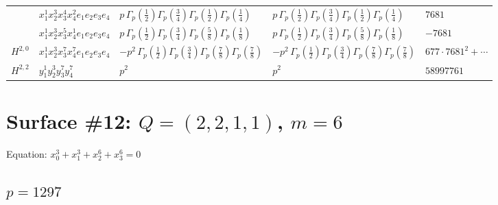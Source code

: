 \documentclass[11pt]{article}
\begin{document}
\begin{table}[ht]
{\begin{tabular}{@{}lllll@{}}
 & $x_{1}^{1} x_{2}^{3} x_{3}^{4} x_{4}^{2}  e_{1} e_{2} e_{3} e_{4}$ & $p \, \Gamma_p \left( \frac{1}{2} \right) \Gamma_p \left( \frac{3}{4} \right) \Gamma_p \left( \frac{1}{2} \right) \Gamma_p \left( \frac{1}{4} \right)$ & $p \, \Gamma_p \left( \frac{1}{2} \right) \Gamma_p \left( \frac{3}{4} \right) \Gamma_p \left( \frac{1}{2} \right) \Gamma_p \left( \frac{1}{4} \right)$ & $7681$ \\
 & $x_{1}^{1} x_{2}^{3} x_{3}^{5} x_{4}^{1}  e_{1} e_{2} e_{3} e_{4}$ & $p \, \Gamma_p \left( \frac{1}{2} \right) \Gamma_p \left( \frac{3}{4} \right) \Gamma_p \left( \frac{5}{8} \right) \Gamma_p \left( \frac{1}{8} \right)$ & $p \, \Gamma_p \left( \frac{1}{2} \right) \Gamma_p \left( \frac{3}{4} \right) \Gamma_p \left( \frac{5}{8} \right) \Gamma_p \left( \frac{1}{8} \right)$ & $-7681$ \\
\midrule
$H^{2,0}$ & $x_{1}^{1} x_{2}^{3} x_{3}^{7} x_{4}^{7}  e_{1} e_{2} e_{3} e_{4}$ & $- p^{2} \, \Gamma_p \left( \frac{1}{2} \right) \Gamma_p \left( \frac{3}{4} \right) \Gamma_p \left( \frac{7}{8} \right) \Gamma_p \left( \frac{7}{8} \right)$ & $- p^{2} \, \Gamma_p \left( \frac{1}{2} \right) \Gamma_p \left( \frac{3}{4} \right) \Gamma_p \left( \frac{7}{8} \right) \Gamma_p \left( \frac{7}{8} \right)$ & $677{\cdot}7681^{2}{+}\cdots$ \\
\midrule
$H^{2,2}$ & $y_{1}^{1} y_{2}^{3} y_{3}^{7} y_{4}^{7}$ & $p^{2} \,$ & $p^{2} \,$ & $58997761$ \\
\bottomrule
\end{tabular}
}
\renewcommand{\arraystretch}{1.0}
\end{table}

\newpage

\section*{Surface \#12: $Q=(2, 2, 1, 1)$, $m=6$}

Equation: $x_0^{3} + x_1^{3} + x_2^{6} + x_3^{6} = 0$

\subsection*{$p = 1297$}
\end{document}

